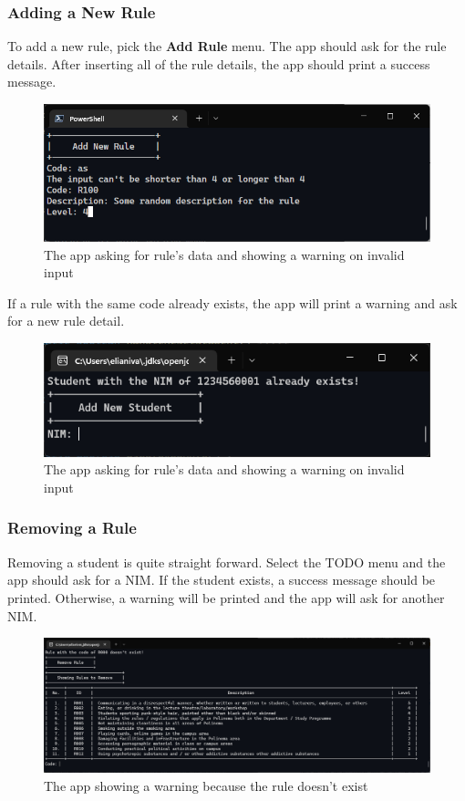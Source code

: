 \documentclass[12pt,titlepage]{article}
\begin{document}
\pagebreak

\subsubsection{Adding a New Rule}
To add a new rule, pick the \textbf{Add Rule} menu. The app should ask for the rule details.
After inserting all of the rule details, the app should print a success message.

\begin{figure}[h]
    \centering
    \includegraphics[width=.8\textwidth]{images/add-rule-input.png}
    \caption{The app asking for rule's data and showing a warning on invalid input}
\end{figure}

If a rule with the same code already exists, the app will print a warning and ask for a new rule detail.

\begin{figure}[h]
    \centering
    \includegraphics[width=.8\textwidth]{images/add-student-warning.png}
    \caption{The app asking for rule's data and showing a warning on invalid input}
\end{figure}

\pagebreak

\subsubsection{Removing a Rule}
Removing a student is quite straight forward. Select the TODO menu and the app should ask for a NIM.
If the student exists, a success message should be printed. Otherwise, a warning will be printed and
the app will ask for another NIM.

\begin{figure}[h]
    \centering
    \includegraphics[width=.8\textwidth]{images/remove-rule-warning.png}
    \caption{The app showing a warning because the rule doesn't exist}
\end{figure}
\end{document}
